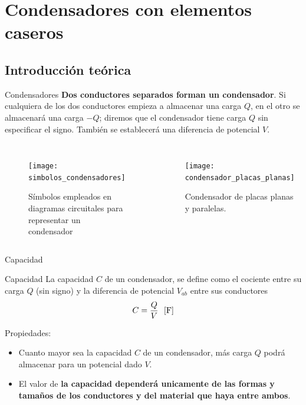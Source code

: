 \documentclass[]{presentation}
\begin{document}
\section{Condensadores con elementos caseros}
\subsection{Introducción teórica}
\begin{frame}{Condensadores}
\textbf{Dos conductores separados forman un condensador}. Si cualquiera de los dos conductores empieza a almacenar una carga $Q$, en el otro se almacenará una carga $-Q$; diremos que el condensador tiene carga $Q$ sin especificar el signo. También se establecerá una diferencia de potencial $V$.
\begin{columns}
	\begin{figure}
		\centering
		\texttt{[image: simbolos\_condensadores]}
		\caption{Símbolos empleados en diagramas circuitales para representar un condensador}
	\end{figure}
	\begin{figure}
		\centering
		\texttt{[image: condensador\_placas\_planas]}
		\caption{Condensador de placas planas y paralelas.}
	\end{figure}
\end{columns}
\end{frame}

\begin{frame}{Capacidad}
\begin{block}{Capacidad}
La capacidad $C$ de un condensador, se define como el cociente entre su carga $Q$ (sin signo) y la diferencia de potencial $V_{ab}$ entre sus conductores
$$
C = \frac{Q}{V} \ \ [\Farad]
$$
\end{block}
Propiedades:
\begin{itemize}
\item Cuanto mayor sea la capacidad $C$ de un condensador, más carga $Q$ podrá almacenar para un potencial dado $V$.
\item El valor de \textbf{la capacidad dependerá unicamente de las formas y tamaños de los conductores y del material que haya entre ambos}.
\end{itemize}
\end{frame}
\end{document}
